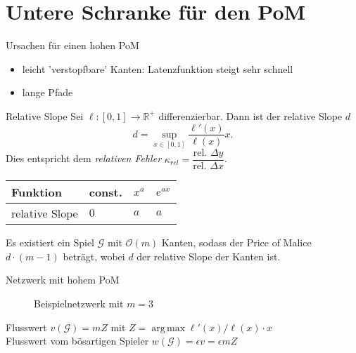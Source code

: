 \documentclass{beamer}
\DeclareMathOperator*{\argmax}{arg\,max}
\begin{document}
\section{Untere Schranke für den PoM}

\begin{frame}{Ursachen für einen hohen PoM}
	\begin{itemize}
		\item leicht 'verstopfbare' Kanten: Latenzfunktion steigt sehr schnell
		\item lange Pfade
	\end{itemize}
\end{frame}

\begin{frame}{Relative Slope}
	Sei $\ell : [0,1] \to \mathbb R^+$ differenzierbar.
	Dann ist der \alert{relative Slope} $d$
	\[ d = \sup_{x \in [0,1]} \dfrac{\ell'(x)}{\ell(x)} x .\]
	Dies entspricht dem \emph{relativen Fehler} $\kappa_{rel} = \dfrac{\text{rel. } \Delta y}{\text{rel. } \Delta x}$.
	
	\begin{table}[]
		\begin{tabular}{@{}llll@{}}
			\toprule
			Funktion       & const. & $x^a$ & $e^{ax}$ \\ \midrule
			relative Slope & $0$      & $a$     & $a$        \\ \bottomrule
		\end{tabular}
	\end{table}
	\begin{theorem}
		Es existiert ein Spiel $\mathcal G$ mit $\mathcal O(m)$ Kanten, sodass der Price of Malice $d \cdot (m-1)$ beträgt, wobei $d$ der relative Slope der Kanten ist.
	\end{theorem}
\end{frame}

\begin{frame}{Netzwerk mit hohem PoM}
	\begin{figure}
	\caption{Beispielnetzwerk mit $m=3$}
	\end{figure}
	
	Flusswert $v(\mathcal G) = mZ$ mit $Z = \argmax \ell'(x)/\ell(x) \cdot x$ \\
	Flusswert vom bösartigen Spieler $w(\mathcal G) = \epsilon v = \epsilon m Z$
\end{frame}
\end{document}
